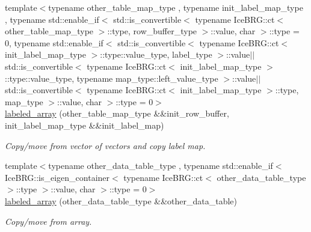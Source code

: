 \begin{DoxyCompactItemize}
{\footnotesize template$<$typename other\+\_\+table\+\_\+map\+\_\+type , typename init\+\_\+label\+\_\+map\+\_\+type , typename std\+::enable\+\_\+if$<$ std\+::is\+\_\+convertible$<$ typename Ice\+B\+R\+G\+::ct$<$ other\+\_\+table\+\_\+map\+\_\+type $>$\+::type, row\+\_\+buffer\+\_\+type $>$\+::value, char $>$\+::type  = 0, typename std\+::enable\+\_\+if$<$ std\+::is\+\_\+convertible$<$ typename Ice\+B\+R\+G\+::ct$<$ init\+\_\+label\+\_\+map\+\_\+type $>$\+::type\+::value\+\_\+type, label\+\_\+type $>$\+::value$\vert$$\vert$                                                       std\+::is\+\_\+convertible$<$ typename Ice\+B\+R\+G\+::ct$<$ init\+\_\+label\+\_\+map\+\_\+type $>$\+::type\+::value\+\_\+type, typename map\+\_\+type\+::left\+\_\+value\+\_\+type $>$\+::value$\vert$$\vert$std\+::is\+\_\+convertible$<$ typename Ice\+B\+R\+G\+::ct$<$ init\+\_\+label\+\_\+map\+\_\+type $>$\+::type, map\+\_\+type $>$\+::value, char $>$\+::type  = 0$>$ }\\\hyperlink{classIceBRG_1_1labeled__array_a9b5b3500da074ee66edd4fc96eb4e0fb}{labeled\+\_\+array} (other\+\_\+table\+\_\+map\+\_\+type \&\&init\+\_\+row\+\_\+buffer, init\+\_\+label\+\_\+map\+\_\+type \&\&init\+\_\+label\+\_\+map)
\begin{DoxyCompactList}\small\item\em Copy/move from vector of vectors and copy label map. \end{DoxyCompactList}\item 
{\footnotesize template$<$typename other\+\_\+data\+\_\+table\+\_\+type , typename std\+::enable\+\_\+if$<$ Ice\+B\+R\+G\+::is\+\_\+eigen\+\_\+container$<$ typename Ice\+B\+R\+G\+::ct$<$ other\+\_\+data\+\_\+table\+\_\+type $>$\+::type $>$\+::value, char $>$\+::type  = 0$>$ }\\\hyperlink{classIceBRG_1_1labeled__array_a6f3b13a1782005e8a630e604eedbdb18}{labeled\+\_\+array} (other\+\_\+data\+\_\+table\+\_\+type \&\&other\+\_\+data\+\_\+table)
\begin{DoxyCompactList}\small\item\em Copy/move from array. \end{DoxyCompactList}\item 

\end{DoxyCompactItemize}
